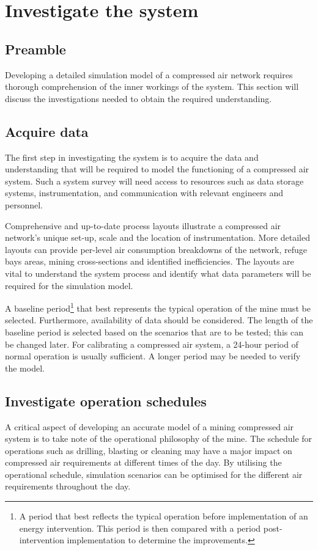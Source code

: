 \section{Investigate the system}
	\subsection{Preamble}
		Developing a detailed simulation model of a compressed air network requires thorough comprehension of the inner workings of the system. This section will discuss the investigations needed to obtain the required understanding.
	\subsection{Acquire data} %
	The first step in investigating the system is to acquire the data and understanding that will be required to model the functioning of a compressed air system. Such a system survey will need access to resources such as data storage systems, instrumentation, and communication with relevant engineers and personnel.
	\par 
	Comprehensive and up-to-date process layouts illustrate a compressed air network's unique set-up, scale and the location of instrumentation. More detailed layouts can provide per-level air consumption breakdowns of the network, refuge bays areas, mining cross-sections and identified inefficiencies. The layouts are vital to understand the system process and identify what data parameters will be required for the simulation model. 
	\par 
	A baseline period\footnote{A period that best reflects the typical operation before implementation of an energy intervention. This period is then compared with a period post-intervention implementation to determine the improvements.} that best represents the typical operation of the mine must be selected. Furthermore, availability of data should be considered. The length of the baseline period is selected based on the scenarios that are to be tested; this can be changed later. For calibrating a compressed air system, a 24-hour period of normal operation is usually sufficient. A longer period may be needed to verify the model. 

	\subsection{Investigate operation schedules}
	A critical aspect of developing an accurate model of a mining compressed air system is to take note of the operational philosophy of the mine. The schedule for operations such as drilling, blasting or cleaning may have a major impact on compressed air requirements at different times of the day. By utilising the operational schedule, simulation scenarios can be optimised for the different air requirements throughout the day.	
	
